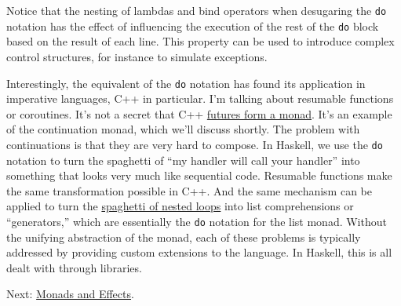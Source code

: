 Notice that the nesting of lambdas and bind operators when desugaring
the \texttt{do} notation has the effect of influencing the execution of
the rest of the \texttt{do} block based on the result of each line. This
property can be used to introduce complex control structures, for
instance to simulate exceptions.

Interestingly, the equivalent of the \texttt{do} notation has found its
application in imperative languages, C++ in particular. I'm talking
about resumable functions or coroutines. It's not a secret that C++
\href{https://bartoszmilewski.com/2014/02/26/c17-i-see-a-monad-in-your-future/}{futures
form a monad}. It's an example of the continuation monad, which we'll
discuss shortly. The problem with continuations is that they are very
hard to compose. In Haskell, we use the \texttt{do} notation to turn the
spaghetti of ``my handler will call your handler'' into something that
looks very much like sequential code. Resumable functions make the same
transformation possible in C++. And the same mechanism can be applied to
turn the
\href{https://bartoszmilewski.com/2014/04/21/getting-lazy-with-c/}{spaghetti
of nested loops} into list comprehensions or ``generators,'' which are
essentially the \texttt{do} notation for the list monad. Without the
unifying abstraction of the monad, each of these problems is typically
addressed by providing custom extensions to the language. In Haskell,
this is all dealt with through libraries.

Next:
\href{https://bartoszmilewski.com/2016/11/30/monads-and-effects/}{Monads
and Effects}.
